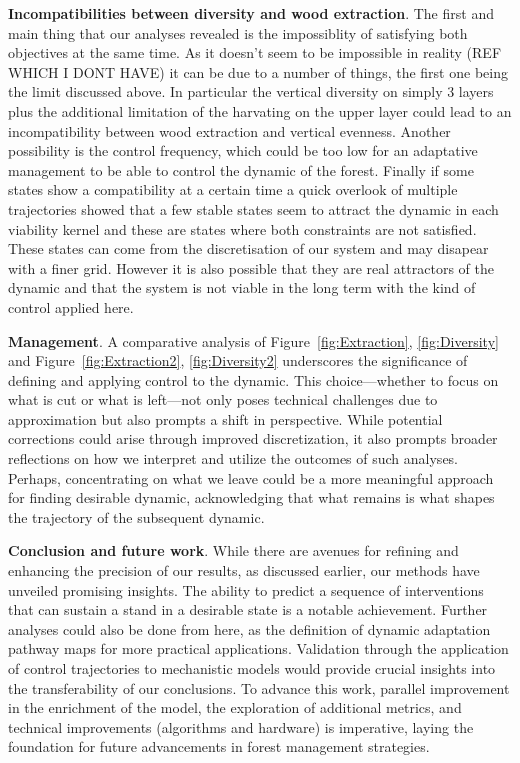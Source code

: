 \documentclass{article}
\begin{document}
\textbf{Incompatibilities between diversity and wood extraction}. The first and main thing that our analyses revealed is the impossiblity of satisfying both objectives at the same time. As it doesn't seem to be impossible in reality (REF WHICH I DONT HAVE) it can be due to a number of things, the first one being the limit discussed above. In particular the vertical diversity on simply 3 layers plus the additional limitation of the harvating on the upper layer could lead to an incompatibility between wood extraction and vertical evenness. Another possibility is the control frequency, which could be too low for an adaptative management to be able to control the dynamic of the forest. Finally if some states show a compatibility at a certain time a quick overlook of multiple trajectories showed that a few stable states seem to attract the dynamic in each viability kernel and these are states where both constraints are not satisfied. These states can come from the discretisation of our system and may disapear with a finer grid. However it is also possible that they are real attractors of the dynamic and that the system is not viable in the long term with the kind of control applied here.

\textbf{Management}. A comparative analysis of Figure~\ref{fig:Extraction}, \ref{fig:Diversity} and Figure~\ref{fig:Extraction2}, \ref{fig:Diversity2} underscores the significance of defining and applying control to the dynamic. This choice—whether to focus on what is cut or what is left—not only poses technical challenges due to approximation but also prompts a shift in perspective. While potential corrections could arise through improved discretization, it also prompts broader reflections on how we interpret and utilize the outcomes of such analyses. Perhaps, concentrating on what we leave could be a more meaningful approach for finding  desirable dynamic, acknowledging that what remains is what shapes the trajectory of the subsequent dynamic.

\textbf{Conclusion and future work}. While there are avenues for refining and enhancing the precision of our results, as discussed earlier, our methods have unveiled promising insights. The ability to predict a sequence of interventions that can sustain a stand in a desirable state is a notable achievement. Further analyses could also be done from here, as the definition of dynamic adaptation pathway maps for more practical applications. Validation through the application of control trajectories to mechanistic models would provide crucial insights into the transferability of our conclusions. To advance this work, parallel improvement in the enrichment of the model, the exploration of additional metrics, and technical improvements (algorithms and hardware) is imperative, laying the foundation for future advancements in forest management strategies.
\end{document}

